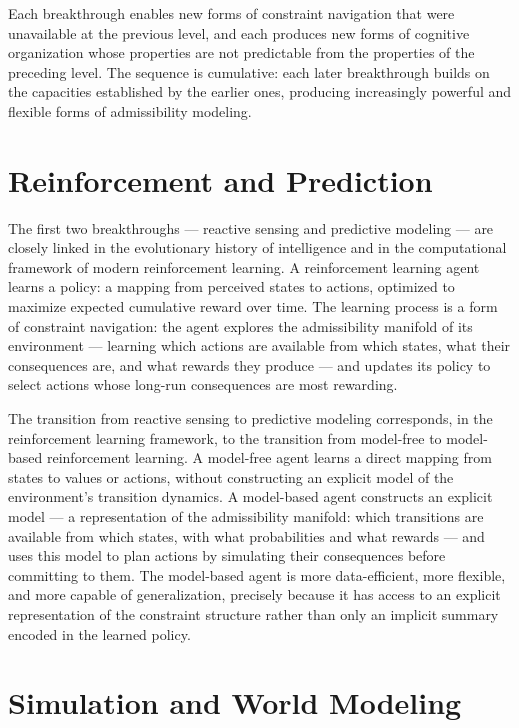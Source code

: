\documentclass[12pt,openany]{book}
\theoremstyle{plain}
\theoremstyle{definition}
\theoremstyle{remark}
\begin{document}
Each breakthrough enables new forms of constraint navigation that were unavailable at the previous level, and each produces new forms of cognitive organization whose properties are not predictable from the properties of the preceding level. The sequence is cumulative: each later breakthrough builds on the capacities established by the earlier ones, producing increasingly powerful and flexible forms of admissibility modeling.

\section{Reinforcement and Prediction}

The first two breakthroughs — reactive sensing and predictive modeling — are closely linked in the evolutionary history of intelligence and in the computational framework of modern reinforcement learning. A reinforcement learning agent learns a policy: a mapping from perceived states to actions, optimized to maximize expected cumulative reward over time. The learning process is a form of constraint navigation: the agent explores the admissibility manifold of its environment — learning which actions are available from which states, what their consequences are, and what rewards they produce — and updates its policy to select actions whose long-run consequences are most rewarding.

The transition from reactive sensing to predictive modeling corresponds, in the reinforcement learning framework, to the transition from model-free to model-based reinforcement learning. A model-free agent learns a direct mapping from states to values or actions, without constructing an explicit model of the environment's transition dynamics. A model-based agent constructs an explicit model — a representation of the admissibility manifold: which transitions are available from which states, with what probabilities and what rewards — and uses this model to plan actions by simulating their consequences before committing to them. The model-based agent is more data-efficient, more flexible, and more capable of generalization, precisely because it has access to an explicit representation of the constraint structure rather than only an implicit summary encoded in the learned policy.

\section{Simulation and World Modeling}
\end{document}
